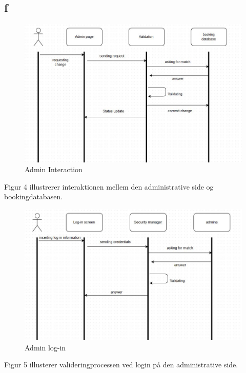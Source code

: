 \documentclass[12pt,a4paper]{article}
\begin{document}
\subsection{f}

\begin{figure}[H]
\centering
\includegraphics[scale=0.6]{adminInteraction.jpg}
\caption{Admin Interaction}
\end{figure}
Figur 4 illustrerer interaktionen mellem den administrative side og bookingdatabasen.\\
\begin{figure}[H]
\centering
\includegraphics[scale=0.6]{adminLog-in.jpg}
\caption{Admin log-in}
\end{figure}
Figur 5 illusterer valideringprocessen ved login på den administrative side.\\
\end{document}

